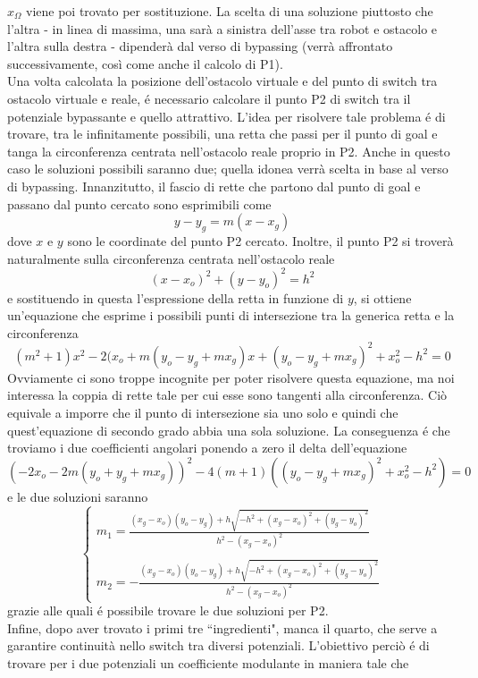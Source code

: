 \documentclass[14pt,a4paper]{extarticle}
\begin{document}
\(x_{\Omega}\) viene poi trovato per sostituzione. La scelta di una soluzione piuttosto che l'altra - in linea di massima, una sarà a sinistra dell'asse tra robot e ostacolo e l'altra sulla destra - dipenderà dal verso di bypassing (verrà affrontato successivamente, così come anche il calcolo di P1).\\
Una volta calcolata la posizione dell'ostacolo virtuale e del punto di switch tra ostacolo virtuale e reale, é necessario calcolare il punto P2 di switch tra il potenziale bypassante e quello attrattivo. L'idea per risolvere tale problema é di trovare, tra le infinitamente possibili, una retta che passi per il punto di goal e tanga la circonferenza centrata nell'ostacolo reale proprio in P2. Anche in questo caso le soluzioni possibili saranno due; quella idonea verrà scelta in base al verso di bypassing. Innanzitutto, il fascio di rette che partono dal punto di goal e passano dal punto cercato sono esprimibili come \[y-y_g = m(x-x_g)\] dove \(x\) e \(y\) sono le coordinate del punto P2 cercato. Inoltre, il punto P2 si troverà naturalmente sulla circonferenza centrata nell'ostacolo reale \[(x-x_o)^2+(y-y_o)^2=h^2\] e sostituendo in questa l'espressione della retta in funzione di \(y\), si ottiene un'equazione che esprime i possibili punti di intersezione tra la generica retta e la circonferenza	
\[(m^2+1)x^2 -2(x_o+m(y_o-y_g+mx_g)x + (y_o-y_g+mx_g)^2+x_o^2-h^2=0\]
Ovviamente ci sono troppe incognite per poter risolvere questa equazione, ma noi interessa la coppia di rette tale per cui esse sono tangenti alla circonferenza. Ciò equivale a imporre che il punto di intersezione sia uno solo e quindi che quest'equazione di secondo grado abbia una sola soluzione. La conseguenza é che troviamo i due coefficienti angolari ponendo a zero il delta dell'equazione\[(-2x_o - 2m(y_o+y_g+mx_g))^2 - 4(m+1)((y_o-y_g+mx_g)^2+x_o^2-h^2)=0\] e le due soluzioni saranno 
\[\begin{cases} 
m_1=\frac{(x_g-x_o)(y_o-y_g)+h\sqrt{-h^2+(x_g-x_o)^2+(y_g-y_o)^2}}{h^2-(x_g-x_o)^2} \\\\
m_2=-\frac{(x_g-x_o)(y_o-y_g)+h\sqrt{-h^2+(x_g-x_o)^2+(y_g-y_o)^2}}{h^2-(x_g-x_o)^2} 
\end{cases}\]
grazie alle quali é possibile trovare le due soluzioni per P2. \\
Infine, dopo aver trovato i primi tre ``ingredienti", manca il quarto, che serve a garantire continuità nello switch tra diversi potenziali. L'obiettivo perciò é di trovare per i due potenziali un coefficiente modulante in maniera tale che 
\end{document}
